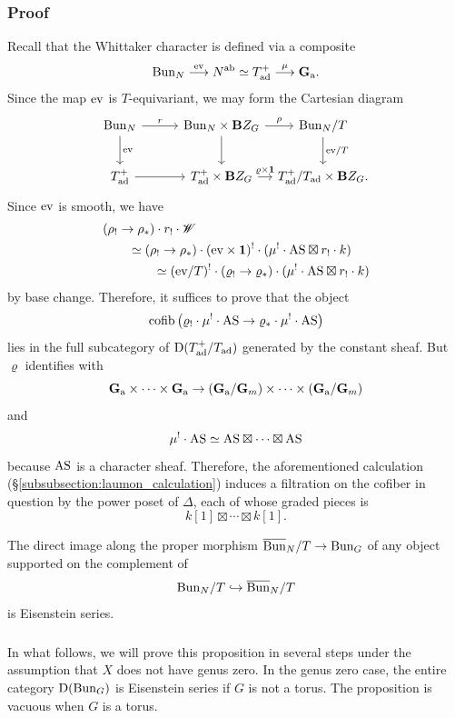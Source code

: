 \subsubsection{Proof} Recall that the Whittaker character is defined via a composite
    \[
    \mathrm{Bun}_N \overset{\mathrm{ev}}{\longrightarrow} N^{\mathrm{ab}} \simeq T_{\mathrm{ad}}^+ \overset{\mu}{\longrightarrow} \mathbf{G}_{\mathrm{a}}.
    \]
Since the map $\mathrm{ev}$ is $T$-equivariant, we may form the Cartesian diagram
\[
\begin{tikzcd}[
  column sep={8em,between origins},
  row sep={4em,between origins}
]
  \Bun_N \arrow[r, "r"] \arrow[d, "\ev"] & \Bun_N \times \BB Z_G \arrow[r, "\rho"] \arrow[d] & \Bun_N / T \arrow[d, "\ev/T"]  \\
  T_\ad^+ \arrow[r] & T_\ad^+ \times \BB Z_G \arrow[r, "\varrho \times \id"] & T_\ad^+ / T_\ad \times \BB Z_G.
\end{tikzcd}
\]
Since $\mathrm{ev}$ is smooth, we have
\begin{align*}
    & (\rho_! \to \rho_*) \cdot r_! \cdot \mathscr{W} \\
    & \qquad \simeq (\rho_! \to \rho_*) \cdot (\mathrm{ev} \times \mathbf{1})^! \cdot (\mu^! \cdot \mathrm{AS} \boxtimes r_! \cdot k) \\
    & \qquad \qquad \simeq (\mathrm{ev}/T)^! \cdot (\varrho_! \to \varrho_*) \cdot (\mu^! \cdot \mathrm{AS} \boxtimes r_! \cdot k )
\end{align*}
by base change. Therefore, it suffices to prove that the object
  \[\mathrm{cofib}\left(\varrho_! \cdot \mu^! \cdot \mathrm{AS} \to \varrho_* \cdot \mu^! \cdot \mathrm{AS} \right)\]
lies in the full subcategory of $\mathrm{D}(T_{\mathrm{ad}}^+/T_{\mathrm{ad}})$ generated by the constant sheaf. But $\varrho$ identifies with
  \[\mathbf{G}_{\mathrm{a}} \times \cdots \times \mathbf{G}_{\mathrm{a}} \to (\mathbf{G}_{\mathrm{a}} / \mathbf{G}_m) \times \cdots \times (\mathbf{G}_{\mathrm{a}} / \mathbf{G}_m)\]
and
  \[\mu^! \cdot \mathrm{AS} \simeq \mathrm{AS} \boxtimes \cdots \boxtimes \mathrm{AS} \]
because $\mathrm{AS}$ is a character sheaf. Therefore, the aforementioned calculation (\S\ref{subsubsection:laumon_calculation}) induces a filtration on the cofiber in question by the power poset of $\Delta$, each of whose graded pieces is
    \[k[1] \boxtimes \cdots \boxtimes k[1].\]

\begin{proposition}
\label{proposition:unipotent_gerbe}
The direct image along the proper morphism $\overline{\mathrm{Bun}}_N/T \to \mathrm{Bun}_G$ of any object supported on the complement of
    \[\mathrm{Bun}_N/T \hookrightarrow \overline{\mathrm{Bun}}_N/T\]
is Eisenstein series.
\end{proposition}

\subsubsection{} In what follows, we will prove this proposition in several steps under the assumption that $X$ does not have genus zero. In the genus zero case, the entire category $\mathrm{D}(\mathrm{Bun}_G)$ is Eisenstein series if $G$ is not a torus. The proposition is vacuous when $G$ is a torus.

